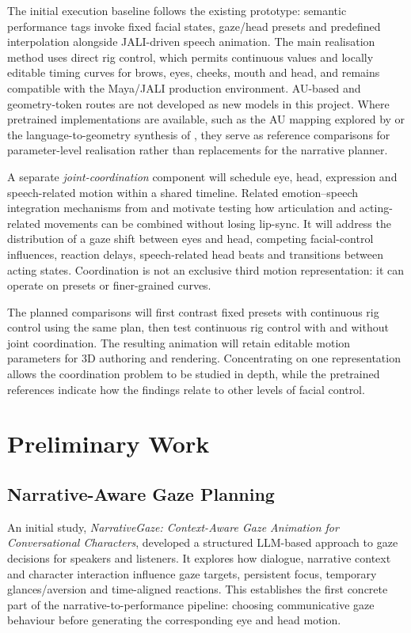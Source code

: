 \documentclass[11pt,a4paper]{article}
\begin{document}
The initial execution baseline follows the existing prototype: semantic performance tags invoke fixed facial states, gaze/head presets and predefined interpolation alongside JALI-driven speech animation. The main realisation method uses direct rig control, which permits continuous values and locally editable timing curves for brows, eyes, cheeks, mouth and head, and remains compatible with the Maya/JALI production environment. AU-based and geometry-token routes are not developed as new models in this project. Where pretrained implementations are available, such as the AU mapping explored by \citet{durupinar2025prompt} or the language-to-geometry synthesis of \citet{song2026tdmm}, they serve as reference comparisons for parameter-level realisation rather than replacements for the narrative planner.

A separate \emph{joint-coordination} component will schedule eye, head, expression and speech-related motion within a shared timeline. Related emotion--speech integration mechanisms from \citet{yang2026destalker} and \citet{yang2026hiftalker} motivate testing how articulation and acting-related movements can be combined without losing lip-sync. It will address the distribution of a gaze shift between eyes and head, competing facial-control influences, reaction delays, speech-related head beats and transitions between acting states. Coordination is not an exclusive third motion representation: it can operate on presets or finer-grained curves.

The planned comparisons will first contrast fixed presets with continuous rig control using the same plan, then test continuous rig control with and without joint coordination. The resulting animation will retain editable motion parameters for 3D authoring and rendering. Concentrating on one representation allows the coordination problem to be studied in depth, while the pretrained references indicate how the findings relate to other levels of facial control.

\section{Preliminary Work}

\subsection{Narrative-Aware Gaze Planning}

An initial study, \emph{NarrativeGaze: Context-Aware Gaze Animation for Conversational Characters}, developed a structured LLM-based approach to gaze decisions for speakers and listeners. It explores how dialogue, narrative context and character interaction influence gaze targets, persistent focus, temporary glances/aversion and time-aligned reactions. This establishes the first concrete part of the narrative-to-performance pipeline: choosing communicative gaze behaviour before generating the corresponding eye and head motion.
\end{document}

